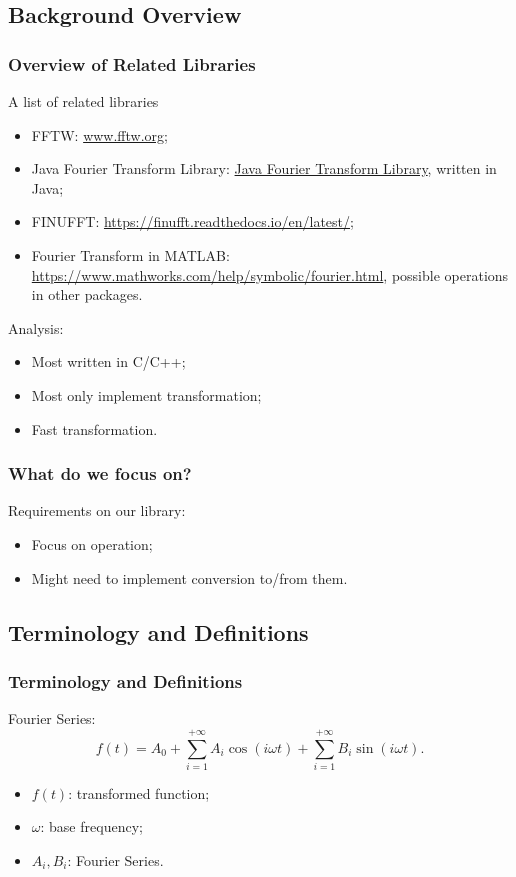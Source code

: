 \documentclass{beamer}
\begin{document}
	\subsection{Background Overview}
	\begin{frame}
		\frametitle{Overview of Related Libraries}
			A list of related libraries
		\begin{itemize}
			\item FFTW: \url{www.fftw.org};
			\item Java Fourier Transform Library: \url{Java Fourier Transform Library}, written in Java;
			\item FINUFFT: \url{https://finufft.readthedocs.io/en/latest/};
			\item Fourier Transform in MATLAB:
			\url{https://www.mathworks.com/help/symbolic/fourier.html}, possible operations in other packages.
		\end{itemize}
		Analysis:
		\begin{itemize}
			\item Most written in C/C++;
			\item Most only implement transformation;
			\item Fast transformation.
		\end{itemize}

	\end{frame}

	\begin{frame}
	\frametitle{What do we focus on?}
		Requirements on our library:
\begin{itemize}
	\item Focus on operation;
	\item Might need to implement conversion to/from them.
\end{itemize}
	\end{frame}

	\subsection{Terminology and Definitions}
	\begin{frame}
		\frametitle{Terminology and Definitions}
		Fourier Series:
		\begin{equation}
			f(t) = A_0+\sum_{i=1}^{+\infty}A_i\cos(i\omega t)+\sum_{i=1}^{+\infty}B_i\sin(i\omega t).
		\end{equation}
		\begin{itemize}
			\item $f(t)$: transformed function;
			\item $\omega$: base frequency;
			\item $A_i, B_i$: Fourier Series.
		\end{itemize}
	\end{frame}
\end{document}
